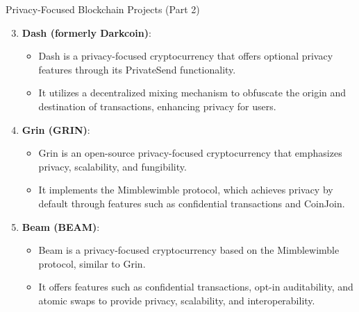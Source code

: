 \begin{frame}{Privacy-Focused Blockchain Projects (Part 2)}
    \begin{enumerate}
        \setcounter{enumi}{2}
        \item \textbf{Dash (formerly Darkcoin)}:
            \begin{itemize}
                \item Dash is a privacy-focused cryptocurrency that offers optional privacy features through its PrivateSend functionality.
                \item It utilizes a decentralized mixing mechanism to obfuscate the origin and destination of transactions, enhancing privacy for users.
            \end{itemize}
        
        \item \textbf{Grin (GRIN)}:
            \begin{itemize}
                \item Grin is an open-source privacy-focused cryptocurrency that emphasizes privacy, scalability, and fungibility.
                \item It implements the Mimblewimble protocol, which achieves privacy by default through features such as confidential transactions and CoinJoin.
            \end{itemize}
        
        \item \textbf{Beam (BEAM)}:
            \begin{itemize}
                \item Beam is a privacy-focused cryptocurrency based on the Mimblewimble protocol, similar to Grin.
                \item It offers features such as confidential transactions, opt-in auditability, and atomic swaps to provide privacy, scalability, and interoperability.
            \end{itemize}
    \end{enumerate}
\end{frame}

